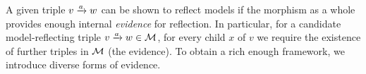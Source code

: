 \begin{comment}
\todo[inline]{In fact, we have two versions of model reflection; it currently is unclear which is the ``better''. The difference is that (ordinary) reflection does not impose any requirement on the witnesses, whereas strong reflection requires that the witness of the reflected model is itself a reflected witness of the original model.}
\begin{definition}[strong model reflection]
Let $\cM\of \cT\to\cU$ be a morphism and let $\trip vaw\in\cM$.
\begin{itemize}[topsep=\itemsep]
\item $a$ \emph{reflects a $\hat w$-model $g$ with witness $h$} if $a\I;g\sat \hat v$ with witness $a\P;h$.
	
\item $a$ \emph{strongly reflects models} if $a$ reflects all $\hat w$-model/witness pairs.
		
\item $\cM$ strongly reflects models if $\rt\cM$ reflects models.
\end{itemize}
\end{definition}
%
\todo[inline]{
The first of these, ``ordinary'' reflection, is the property we are really after; at some point we thought that strong reflection would be necessary for building an inductive proof, but currently that seems not to be the case. If that is born out, we can forget about strong reflection.
}
\end{comment}
%
A given triple $\trip vaw$ can be shown to reflect models if the morphism as a whole provides enough internal \emph{evidence} for reflection. In particular, for a candidate model-reflecting triple $\trip vaw\in \cM$, for every child $x$ of $v$ we require the existence of further triples in ${\mathcal{M}}$ (the evidence). To obtain a rich enough framework, we introduce diverse forms of evidence.

